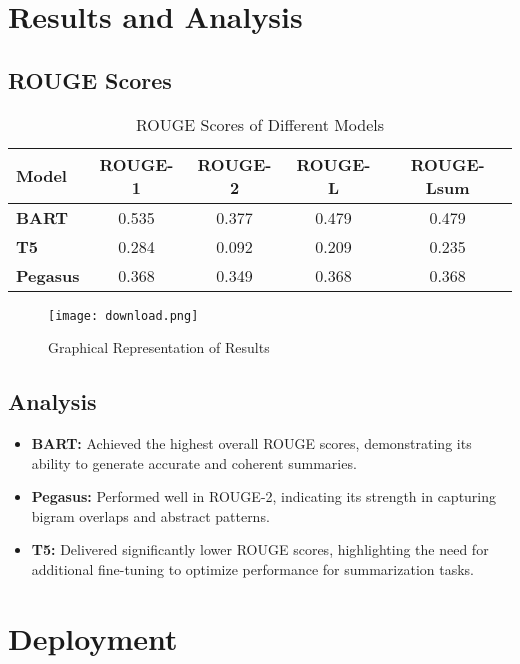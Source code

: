 \documentclass[a4paper,12pt]{article}
\begin{document}
\section{Results and Analysis}
\subsection{ROUGE Scores}
\begin{table}[h!]
    \centering
    \begin{tabular}{|l|c|c|c|c|}
    \hline
    \textbf{Model} & \textbf{ROUGE-1} & \textbf{ROUGE-2} & \textbf{ROUGE-L} & \textbf{ROUGE-Lsum} \\
    \hline
    \textbf{BART} & 0.535 & 0.377 & 0.479 & 0.479 \\
    \textbf{T5} & 0.284 & 0.092 & 0.209 & 0.235 \\
    \textbf{Pegasus} & 0.368 & 0.349 & 0.368 & 0.368 \\
    \hline
    \end{tabular}
    \caption{ROUGE Scores of Different Models}
\end{table}
\begin{figure}
          \centering
          \texttt{[image: download.png]}
           \caption{Graphical Representation of Results}
        \end{figure}

\subsection{Analysis}
\begin{itemize}
    \item \textbf{BART:} Achieved the highest overall ROUGE scores, demonstrating its ability to generate accurate and coherent summaries.
    \item \textbf{Pegasus:} Performed well in ROUGE-2, indicating its strength in capturing bigram overlaps and abstract patterns.
    \item \textbf{T5:} Delivered significantly lower ROUGE scores, highlighting the need for additional fine-tuning to optimize performance for summarization tasks.
\end{itemize}

        



\section{Deployment}
\end{document}
